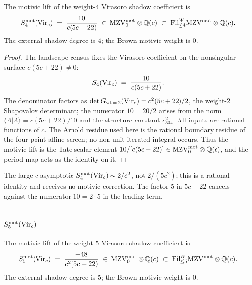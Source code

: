 \begin{proposition}
\ClaimStatusProvedHere
The motivic lift of the weight-$4$ Virasoro shadow coefficient is
\[
 S_4^{\mathrm{mot}}(\mathrm{Vir}_c) \;=\; \frac{10}{c (5c + 22)}
 \;\in\; \mathrm{MZV}^{\mathrm{mot}}_{0} \otimes \mathbb{Q}(c)
 \;\subset\; \mathrm{Fil}^W_{\le 4}\mathrm{MZV}^{\mathrm{mot}} \otimes \mathbb{Q}(c).
\]
The external shadow degree is $4$; the Brown motivic weight is $0$.
\end{proposition}

\begin{proof}
The landscape census fixes the Virasoro coefficient on the nonsingular
surface $c(5c+22)\ne0$:
\[
 S_4(\mathrm{Vir}_c) \;=\; \frac{10}{c (5c + 22)}.
\]
The denominator factors as
$\det G_{\mathrm{wt}\,=\,2}(\mathrm{Vir}_c) = c^2(5c+22)/2$, the weight-$2$
Shapovalov determinant; the numerator $10 = 20/2$ arises from
the norm $\langle\Lambda|\Lambda\rangle = c(5c+22)/10$ and the
structure constant $c_{334}^2$. All inputs are rational functions
of $c$. The Arnold residue used here is the rational boundary residue
of the four-point affine screen; no non-unit iterated integral occurs.
Thus the motivic lift is the Tate-scalar element
$10/[c(5c+22)]\in\mathrm{MZV}^{\mathrm{mot}}_0\otimes\mathbb Q(c)$, and the period map
acts as the identity on it.
\end{proof}

\begin{remark}
The large-$c$ asymptotic $S_4^{\mathrm{mot}}(\mathrm{Vir}_c) \sim 2/c^2$, not
$2/(5c^2)$; this is a rational identity and receives no motivic
correction. The factor $5$ in $5c+22$ cancels against the numerator
$10=2\cdot5$ in the leading term.
\end{remark}

\subsection{$S_5^{\mathrm{mot}}(\mathrm{Vir}_c)$}

\begin{proposition}
\ClaimStatusProvedHere
The motivic lift of the weight-$5$ Virasoro shadow coefficient is
\[
 S_5^{\mathrm{mot}}(\mathrm{Vir}_c) \;=\; \frac{-48}{c^2 (5c + 22)}
 \;\in\; \mathrm{MZV}^{\mathrm{mot}}_{0} \otimes \mathbb{Q}(c)
 \;\subset\; \mathrm{Fil}^W_{\le 5}\mathrm{MZV}^{\mathrm{mot}} \otimes \mathbb{Q}(c).
\]
The external shadow degree is $5$; the Brown motivic weight is $0$.
\end{proposition}

